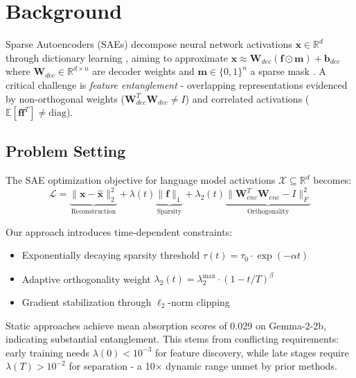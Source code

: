 \documentclass{article} %
\begin{document}
\section{Background}
\label{sec:background}
Sparse Autoencoders (SAEs) decompose neural network activations $\mathbf{x} \in \mathbb{R}^d$ through dictionary learning \cite{bussmannBatchTopKSparseAutoencoders2024}, aiming to approximate $\mathbf{x} \approx \mathbf{W}_{dec}(\mathbf{f} \odot \mathbf{m}) + \mathbf{b}_{dec}$ where $\mathbf{W}_{dec} \in \mathbb{R}^{d \times n}$ are decoder weights and $\mathbf{m} \in \{0,1\}^n$ a sparse mask \cite{ghilardiEfficientTrainingSparse2024a}. A critical challenge is \textit{feature entanglement} \cite{chaninAbsorptionStudyingFeature2024} - overlapping representations evidenced by non-orthogonal weights ($\mathbf{W}_{dec}^T\mathbf{W}_{dec} \neq I$) and correlated activations ($\mathbb{E}[\mathbf{f}\mathbf{f}^T] \neq \text{diag}$).

\subsection{Problem Setting}
\label{subsec:problem}
The SAE optimization objective for language model activations $\mathcal{X} \subseteq \mathbb{R}^d$ becomes:
\begin{equation}
    \mathcal{L} = \underbrace{\|\mathbf{x} - \mathbf{\hat{x}}\|_2^2}_{\text{Reconstruction}} + \lambda(t)\underbrace{\|\mathbf{f}\|_1}_{\text{Sparsity}} + \lambda_2(t)\underbrace{\|\mathbf{W}_{enc}^T\mathbf{W}_{enc} - I\|_F^2}_{\text{Orthogonality}}
\end{equation}

Our approach introduces time-dependent constraints:
\begin{itemize}
    \item Exponentially decaying sparsity threshold $\tau(t) = \tau_0 \cdot \exp(-\alpha t)$
    \item Adaptive orthogonality weight $\lambda_2(t) = \lambda_{2}^{\text{max}} \cdot (1 - t/T)^\beta$
    \item Gradient stabilization through $\ell_2$-norm clipping
\end{itemize}

Static approaches \cite{rajamanoharanJumpingAheadImproving2024} achieve mean absorption scores of 0.029 on Gemma-2-2b, indicating substantial entanglement. This stems from conflicting requirements: early training needs $\lambda(0) < 10^{-3}$ for feature discovery, while late stages require $\lambda(T) > 10^{-2}$ for separation - a 10$\times$ dynamic range unmet by prior methods.
\end{document}
